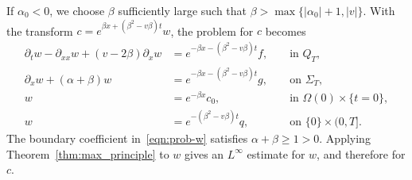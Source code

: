 \documentclass[11pt,reqno]{amsart}
\theoremstyle{plain}
\theoremstyle{definition}
\numberwithin{equation}{section}
\newcommand{\p}{\partial}
\newcommand{\abs}[1]{\left\lvert #1 \right\rvert}
\begin{document}
If $\alpha_0 < 0$, we choose $\beta$ sufficiently large such that $\beta >\max\{\abs{\alpha_0} + 1, \abs{v}\}$.
With the transform $c=e^{\beta x+(\beta^2-v\beta)t}w$, the problem for $c$
becomes
\begin{equation}\label{eqn:prob-w}
\begin{aligned}
    \p_t w  - \p_{xx} w + (v - 2\beta) \p_x w &= e^{-\beta x - (\beta^2 - v\beta)t} f, && \text{ in } Q_T, \\
    \p_x w + (\alpha + \beta) w &= e^{-\beta x - (\beta^2 - v\beta)t} g, && \text{ on } \Sigma_T, \\
    w &= e^{-\beta x} c_0, && \text{ in } \Omega(0) \times \{t=0\}, \\
    w &= e^{-(\beta^2 - v\beta)t} q, && \text{ on } \{0\} \times (0,T].
\end{aligned}
\end{equation}
The boundary coefficient in~\eqref{eqn:prob-w} satisfies
$\alpha+\beta\ge1>0$. Applying Theorem~\ref{thm:max_principle} to $w$ gives an
$L^\infty$ estimate for $w$, and therefore for $c$.
\end{document}
